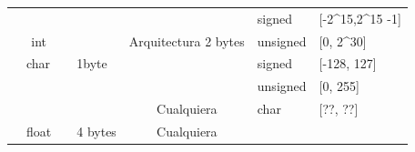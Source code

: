 \documentclass{article}
\begin{document}
\begin{table}[H]
\begin{tabular}{|l|lll|c|ll|}
    \rowcolor[HTML]{EBD178} 
    \cellcolor[HTML]{C0C0C0}                          & \multicolumn{1}{c|}{\cellcolor[HTML]{EBD178}}                         & \multicolumn{2}{l|}{\cellcolor[HTML]{EBD178}}                   & \multicolumn{1}{r|}{\cellcolor[HTML]{EBD178}}                                       & signed                                             & {[}-2\textasciicircum{}15,2\textasciicircum{}15 -1{]}                    \\ \cline{6-7} 
    \rowcolor[HTML]{EBD178} 
    \cellcolor[HTML]{C0C0C0}                          & \multicolumn{1}{c|}{\multirow{-5}{*}{\cellcolor[HTML]{EBD178}int}}    & \multicolumn{2}{l|}{\multirow{-2}{*}{\cellcolor[HTML]{EBD178}}} & \multicolumn{1}{r|}{\multirow{-2}{*}{\cellcolor[HTML]{EBD178}Arquitectura 2 bytes}} & unsigned                                           & {[}0, 2\textasciicircum{}30{]}                                           \\ \cline{2-7} 
    \rowcolor[HTML]{EB6C70} 
    \cellcolor[HTML]{C0C0C0}                          & \multicolumn{1}{l|}{\cellcolor[HTML]{EB6C70}char}                     &                                  & 1byte                        & \cellcolor[HTML]{EB6C70}                                                            & signed                                             & {[}-128, 127{]}                                                          \\ \cline{2-4} \cline{6-7} 
    \rowcolor[HTML]{EB6C70} 
    \cellcolor[HTML]{C0C0C0}                          & \multicolumn{3}{l}{\cellcolor[HTML]{EB6C70}}                                                                                            & \cellcolor[HTML]{EB6C70}                                                            & unsigned                                           & {[}0, 255{]}                                                             \\ \cline{6-7} 
    \rowcolor[HTML]{EB6C70} 
    \multirow{-8}{*}{\cellcolor[HTML]{C0C0C0}Enteros} & \multicolumn{3}{l}{\multirow{-2}{*}{\cellcolor[HTML]{EB6C70}}}                                                                          & \multirow{-3}{*}{\cellcolor[HTML]{EB6C70}Cualquiera}                                & char                                               & {[}??, ??{]}                                                             \\ \hline
    \rowcolor[HTML]{84EBA0} 
    \cellcolor[HTML]{C0C0C0}                          & \multicolumn{1}{l|}{\cellcolor[HTML]{84EBA0}float}                    &                                  & 4 bytes                      & Cualquiera                                                                          & \multicolumn{2}{l|}{\cellcolor[HTML]{84EBA0}}                                                                                 \\ \cline{2-7} 

\end{tabular}
\end{table}
\end{document}
